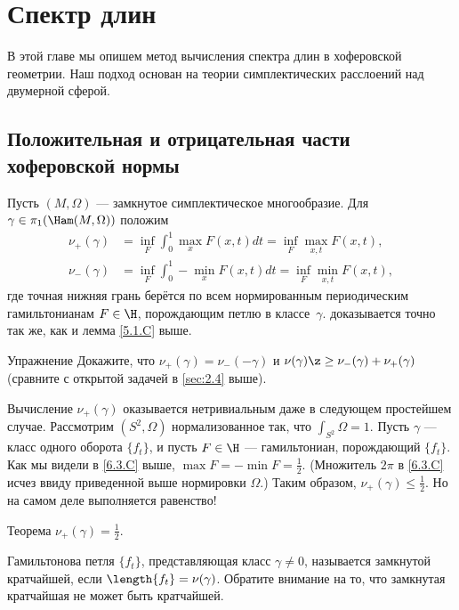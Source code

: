 \chapter{Спектр длин}

В этой главе мы опишем метод вычисления спектра длин в хоферовской геометрии.
Наш подход основан на теории симплектических расслоений над двумерной сферой.

\section{Положительная и отрицательная части хоферовской нормы}

Пусть $(M, \Omega)$ --- замкнутое симплектическое многообразие.
Для $\gamma \in \pi_1 (\Ham(M, \Omega))$ положим 
\begin{align*}
\nu_+ (\gamma) &= \inf_F \int_0^1 \max_x F (x, t)dt = \inf_F \max_{x,t}F (x, t),
\\ 
\nu_- (\gamma) &= \inf_F \int_0^1 -\min_x F (x, t)dt = \inf_F \min_{x,t}F (x, t),
\end{align*}
где точная нижняя грань берётся по всем нормированным периодическим гамильтонианам $F \in \H$, порождающим петлю в классе~$\gamma$.
 доказывается точно так же, как и лемма \ref{5.1.C} выше.

\begin{thm*}{Упражнение}
Докажите, что $\nu_+ (\gamma) = \nu_- (-\gamma)$ и $\nu(\gamma) \z\ge \nu_- (\gamma) + \nu_+ (\gamma)$
(сравните с открытой задачей в \ref{sec:2.4} выше).
\end{thm*}

Вычисление $\nu_+ (\gamma)$ оказывается нетривиальным даже в следующем простейшем случае.
Рассмотрим $(S^2, \Omega)$ нормализованное так, что $\int_{S^2} \Omega = 1$.
Пусть $\gamma$ --- класс одного оборота $\{f_t\}$, и пусть $F \in \H$ --- гамильтониан, порождающий $\{f_t\}$.
Как мы видели в \ref{6.3.C} выше,  $\max F = - \min F = \frac12$.
(Множитель $2\pi$ в \ref{6.3.C} исчез ввиду приведенной выше нормировки $\Omega$.)
Таким образом, $\nu_+ (\gamma) \le \frac12$.
Но на самом деле выполняется равенство!

\begin{thm}{Теорема}\label{9.1.A}
$\nu_+ (\gamma) = \frac12$.
\end{thm}

Гамильтонова петля $\{f_t \}$, представляющая класс $\gamma \ne 0$, называется замкнутой кратчайшей, если $\length\{f_t \} = \nu(\gamma)$.
Обратите внимание на то, что замкнутая кратчайшая не может быть кратчайшей.

